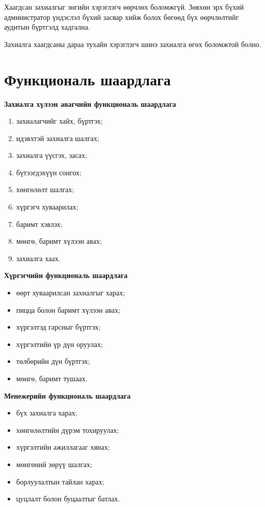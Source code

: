 Хаагдсан захиалгыг энгийн хэрэглэгч өөрчлөх боломжгүй. Зөвхөн эрх бүхий администратор үндэслэл бүхий засвар хийж болох бөгөөд бүх өөрчлөлтийг аудитын бүртгэлд хадгална.

Захиалга хаагдсаны дараа тухайн хэрэглэгч шинэ захиалга өгөх боломжтой болно.

\section{Функциональ шаардлага}

\textbf{Захиалга хүлээн авагчийн функциональ шаардлага}
\begin{enumerate}
    \item захиалагчийг хайх, бүртгэх;
    \item идэвхтэй захиалга шалгах;
    \item захиалга үүсгэх, засах;
    \item бүтээгдэхүүн сонгох;
    \item хөнгөлөлт шалгах;
    \item хүргэгч хуваарилах;
    \item баримт хэвлэх;
    \item мөнгө, баримт хүлээн авах;
    \item захиалга хаах.
\end{enumerate}

\textbf{Хүргэгчийн функциональ шаардлага}
\begin{itemize}
    \item өөрт хуваарилсан захиалгыг харах;
    \item пицца болон баримт хүлээн авах;
    \item хүргэлтэд гарсныг бүртгэх;
    \item хүргэлтийн үр дүн оруулах;
    \item төлбөрийн дүн бүртгэх;
    \item мөнгө, баримт тушаах.
\end{itemize}

\textbf{Менежерийн функциональ шаардлага}
\begin{itemize}
    \item бүх захиалга харах;
    \item хөнгөлөлтийн дүрэм тохируулах;
    \item хүргэлтийн ажиллагааг хянах;
    \item мөнгөний зөрүү шалгах;
    \item борлуулалтын тайлан харах;
    \item цуцлалт болон буцаалтыг батлах.
\end{itemize}
    
